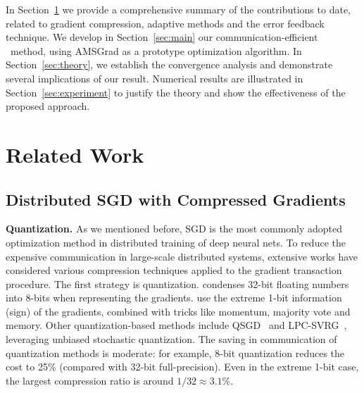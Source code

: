 \documentclass[11pt]{article}
\begin{document}
In Section~\ref{sec:related} we provide a comprehensive summary of the contributions to date, related to gradient compression, adaptive methods and the error feedback technique. We develop in Section~\ref{sec:main} our communication-efficient \algo\ method, using AMSGrad as a prototype optimization algorithm.
In Section~\ref{sec:theory}, we establish the convergence analysis and demonstrate several implications of our result. Numerical results are illustrated in Section~\ref{sec:experiment} to justify the theory and show the effectiveness of the proposed approach.


\section{Related Work}\label{sec:related}

\subsection{Distributed SGD with Compressed Gradients}

\textbf{Quantization.}\hspace{0.1in} As we mentioned before, SGD is the most commonly adopted optimization method in distributed training of deep neural nets. To reduce the expensive communication in large-scale distributed systems, extensive works have considered various compression techniques applied to the gradient transaction procedure. The first strategy is quantization. \cite{Proc:8-bit_ICLR16} condenses 32-bit floating numbers into 8-bits when representing the gradients. \cite{Proc:Seide14,bernstein2018signsgd,karimireddy2019error,Proc:Bernstein_ICLR19} use the extreme 1-bit information (sign) of the gradients, combined with tricks like momentum, majority vote and memory. Other quantization-based methods include QSGD~\cite{alistarh2017qsgd,Proc:Wu_ICML18,Proc:Zhang_ICML17} and LPC-SVRG~\cite{Proc:Yu_AISTATS19}, leveraging unbiased stochastic quantization. The saving in communication of quantization methods is moderate: for example, 8-bit quantization reduces the cost to 25\% (compared with 32-bit full-precision). Even in the extreme 1-bit case, the largest compression ratio is around $1/32\approx 3.1\%$. 
\end{document}
